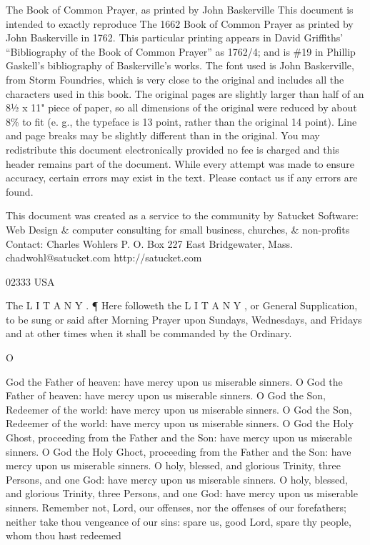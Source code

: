 The Book of Common Prayer, as printed by John Baskerville This document is intended to exactly reproduce The 1662 Book of Common Prayer as printed by John Baskerville in 1762. This particular printing appears in David Griffiths' “Bibliography of the Book of Common Prayer” as 1762/4; and is \#19 in Phillip Gaskell's bibliography of Baskerville's works. The font used is John Baskerville, from Storm Foundries, which is very close to the original and includes all the characters used in this book. The original pages are slightly larger than half of an 8½ x 11" piece of paper, so all dimensions of the original were reduced by about 8\% to fit (e. g., the typeface is 13 point, rather than the original 14 point). Line and page breaks may be slightly different than in the original. You may redistribute this document electronically provided no fee is charged and this header remains part of the document. While every attempt was made to ensure accuracy, certain errors may exist in the text. Please contact us if any errors are found.

This document was created as a service to the community by Satucket Software: Web Design \& computer consulting for small business, churches, \& non-profits Contact: Charles Wohlers P. O. Box 227 East Bridgewater, Mass. chadwohl@satucket.com http://satucket.com

02333 USA

The L I T A N Y . ¶ Here followeth the L I T A N Y , or General Supplication, to be sung or said after Morning Prayer upon Sundays, Wednesdays, and Fridays and at other times when it shall be commanded by the Ordinary.

O

God the Father of heaven: have mercy upon us miserable sinners. O God the Father of heaven: have mercy upon us miserable sinners. O God the Son, Redeemer of the world: have mercy upon us miserable sinners. O God the Son, Redeemer of the world: have mercy upon us miserable sinners. O God the Holy Ghost, proceeding from the Father and the Son: have mercy upon us miserable sinners. O God the Holy Ghoct, proceeding from the Father and the Son: have mercy upon us miserable sinners. O holy, blessed, and glorious Trinity, three Persons, and one God: have mercy upon us miserable sinners. O holy, blessed, and glorious Trinity, three Persons, and one God: have mercy upon us miserable sinners. Remember not, Lord, our offenses, nor the offenses of our forefathers; neither take thou vengeance of our sins: spare us, good Lord, spare thy people, whom thou hast redeemed

